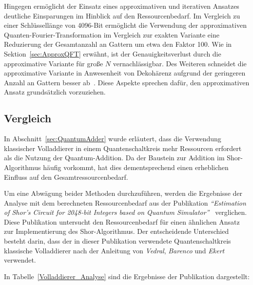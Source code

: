 Hingegen ermöglicht der Einsatz eines approximativen und iterativen Ansatzes deutliche Einsparungen im Hinblick auf den Ressourcenbedarf. 
Im Vergleich zu einer Schlüssellänge von 4096-Bit ermöglicht die Verwendung der approximativen Quanten-Fourier-Transformation im Vergleich zur exakten Variante eine Reduzierung der Gesamtanzahl an Gattern um etwa den Faktor 100.
Wie in Sektion~\ref{sec:ApproxQFT} erwähnt, ist der Genauigkeitsverlust durch die approximative Variante für große \(N\) vernachlässigbar. 
Des Weiteren schneidet die approximative Variante in Anwesenheit von Dekohärenz aufgrund der geringeren Anzahl an Gattern besser ab~\cite{Barenco_1996}. 
Diese Aspekte sprechen dafür, den approximativen Ansatz grundsätzlich vorzuziehen.

\subsection*{Vergleich}
In Abschnitt~\ref{sec:QuantumAdder} wurde erläutert, 
dass die Verwendung klassischer Volladdierer in einem Quantenschaltkreis mehr Ressourcen erfordert als die Nutzung der Quantum-Addition. 
Da der Baustein zur Addition im Shor-Algorithmus häufig vorkommt, 
hat dies dementsprechend einen erheblichen Einfluss auf den Gesamtressourcenbedarf.

Um eine Abwägung beider Methoden durchzuführen, 
werden die Ergebnisse der Analyse mit dem berechneten Ressourcenbedarf aus der Publikation \textit{"`Estimation of Shor’s Circuit for 2048-bit Integers
based on Quantum Simulator"'}~\cite{cryptoeprint:2023/092} verglichen. 
Diese Publikation untersucht den Ressourcenbedarf für einen ähnlichen Ansatz zur Implementierung des Shor-Algorithmus.
Der entscheidende Unterschied besteht darin, 
dass der in dieser Publikation verwendete Quantenschaltkreis klassische Volladdierer nach der Anleitung von 
\textit{Vedral}, \textit{Barenco} und \textit{Ekert}~\cite{Vedral_1996} verwendet.

In Tabelle~\ref{Volladdierer_Analyse} sind die Ergebnisse der Publikation dargestellt:

